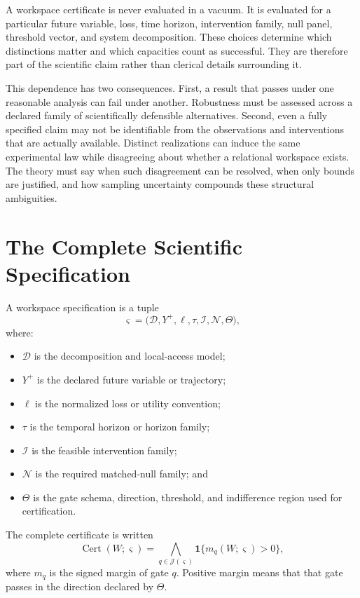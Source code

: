 A workspace certificate is never evaluated in a vacuum. It is evaluated for a
particular future variable, loss, time horizon, intervention family, null
panel, threshold vector, and system decomposition. These choices determine
which distinctions matter and which capacities count as successful. They are
therefore part of the scientific claim rather than clerical details surrounding
it.

This dependence has two consequences. First, a result that passes under one
reasonable analysis can fail under another. Robustness must be assessed across
a declared family of scientifically defensible alternatives. Second, even a
fully specified claim may not be identifiable from the observations and
interventions that are actually available. Distinct realizations can induce the
same experimental law while disagreeing about whether a relational workspace
exists. The theory must say when such disagreement can be resolved, when only
bounds are justified, and how sampling uncertainty compounds these structural
ambiguities.

\section{The Complete Scientific Specification}

\begin{SRWTdefinition}\label{SRWT:def:workspace-specification}
A workspace specification is a tuple
\[
\boxed{
\varsigma
=
\bigl(
\mathcal D,
Y^+,
\ell,
\tau,
\mathcal I,
\mathcal N,
\Theta
\bigr),
}
\]
where:
\begin{itemize}
\item \(\mathcal D\) is the decomposition and local-access model;
\item \(Y^+\) is the declared future variable or trajectory;
\item \(\ell\) is the normalized loss or utility convention;
\item \(\tau\) is the temporal horizon or horizon family;
\item \(\mathcal I\) is the feasible intervention family;
\item \(\mathcal N\) is the required matched-null family; and
\item \(\Theta\) is the gate schema, direction, threshold, and indifference
 region used for certification.
\end{itemize}
The complete certificate is written
\[
\operatorname{Cert}(W;\varsigma)
=
\bigwedge_{q\in\mathcal J(\varsigma)}
\mathbf 1\{m_q(W;\varsigma)>0\},
\]
where \(m_q\) is the signed margin of gate \(q\). Positive margin means that
that gate passes in the direction declared by \(\Theta\).
\end{SRWTdefinition}


